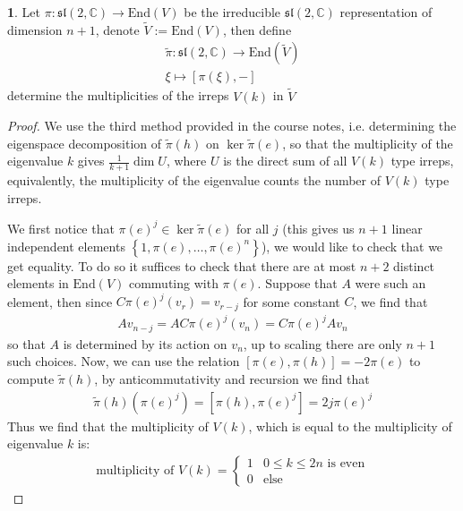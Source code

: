 \documentclass[10.5pt]{article}
\theoremstyle{definition}
\newtheorem{pb}{}
\newcommand{\set}[1]{\left\{#1\right\}}
\begin{document}
    \begin{pb}
        Let \(\pi: \mathfrak{sl}(2,\mathbb{C}) \to \text{End}(V)\) be the irreducible \(\mathfrak{sl}(2,\mathbb{C})\) representation of dimension \(n+1\), denote \(\tilde{V} := \text{End}(V)\), then define
        \begin{align*}
            \tilde{\pi}: \mathfrak{sl}(2,\mathbb{C}) \to \text{End}(\tilde{V}) \\
            \xi \mapsto [\pi(\xi),-]
        \end{align*}
        determine the multiplicities of the irreps \(V(k)\) in \(\tilde{V}\)

        \begin{proof}
            We use the third method provided in the course notes, i.e. determining the eigenspace decomposition of \(\tilde{\pi}(h)\) on \(\ker \tilde{\pi}(e)\), so that the multiplicity of the eigenvalue \(k\) gives \(\frac{1}{k+1}\dim U\), where \(U\) is the direct sum of all \(V(k)\) type irreps, equivalently, the multiplicity of the eigenvalue counts the number of \(V(k)\) type irreps.

            We first notice that \(\pi(e)^j \in \ker\tilde{\pi}(e)\) for all \(j\) (this gives us \(n+1\) linear independent elements \(\set{1,\pi(e),\hdots,\pi(e)^{n}}\)), we would like to check that we get equality. To do so it suffices to check that there are at most \(n+2\) distinct elements in \(\text{End}(V)\) commuting with \(\pi(e)\). Suppose that \(A\) were such an element, then since \(C\pi(e)^j(v_r) = v_{r-j}\) for some constant \(C\), we find that
            \begin{align*}
                A v_{n-j} = A C\pi(e)^j(v_n) = C\pi(e)^j A v_n
            \end{align*}
            so that \(A\) is determined by its action on \(v_n\), up to scaling there are only \(n+1\) such choices. Now, we can use the relation \([\pi(e),\pi(h)] = -2\pi(e)\) to compute \(\tilde{\pi}(h)\), by anticommutativity and recursion we find that
            \begin{align*}
                \tilde{\pi}(h)(\pi(e)^j) = [\pi(h),\pi(e)^j] = 2j\pi(e)^j
            \end{align*}
            Thus we find that the multiplicity of \(V(k)\), which is equal to the multiplicity of eigenvalue \(k\) is:
            \begin{align*}
                \text{multiplicity of } V(k) = \begin{cases}
                    1 & 0 \leq k \leq 2 n \text{ is even} \\
                    0 & \text{else}
                \end{cases}
            \end{align*}
        \end{proof}
    \end{pb}
\end{document}
